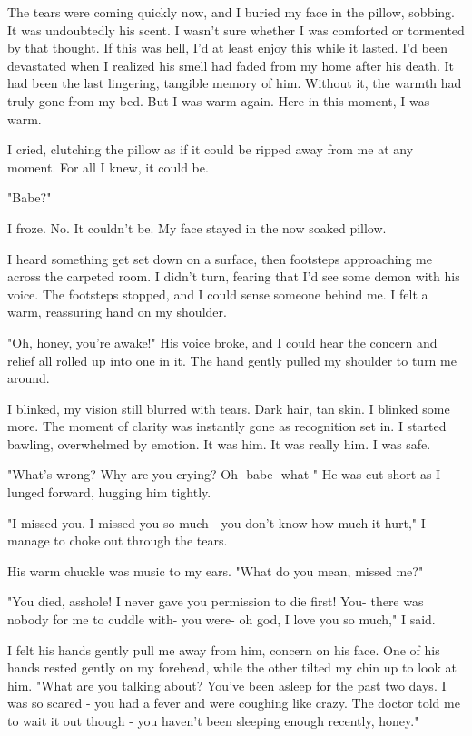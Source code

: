 The tears were coming quickly now, and I buried my face in the pillow, sobbing. It was undoubtedly his scent. I wasn't sure whether I was comforted or tormented by that thought. If this was hell, I'd at least enjoy this while it lasted. I'd been devastated when I realized his smell had faded from my home after his death. It had been the last lingering, tangible memory of him. Without it, the warmth had truly gone from my bed. But I was warm again. Here in this moment, I was warm.

I cried, clutching the pillow as if it could be ripped away from me at any moment. For all I knew, it could be.

"Babe?"

I froze. No. It couldn't be. My face stayed in the now soaked pillow.

I heard something get set down on a surface, then footsteps approaching me across the carpeted room. I didn't turn, fearing that I'd see some demon with his voice. The footsteps stopped, and I could sense someone behind me. I felt a warm, reassuring hand on my shoulder.

"Oh, honey, you're awake!" His voice broke, and I could hear the concern and relief all rolled up into one in it. The hand gently pulled my shoulder to turn me around.

I blinked, my vision still blurred with tears. Dark hair, tan skin. I blinked some more. The moment of clarity was instantly gone as recognition set in. I started bawling, overwhelmed by emotion. It was him. It was really him. I was safe.

"What's wrong? Why are you crying? Oh- babe- what-" He was cut short as I lunged forward, hugging him tightly.

"I missed you. I missed you so much - you don't know how much it hurt," I manage to choke out through the tears.

His warm chuckle was music to my ears. "What do you mean, missed me?"

"You died, asshole! I never gave you permission to die first! You- there was nobody for me to cuddle with- you were- oh god, I love you so much," I said.

I felt his hands gently pull me away from him, concern on his face. One of his hands rested gently on my forehead, while the other tilted my chin up to look at him. "What are you talking about? You've been asleep for the past two days. I was so scared - you had a fever and were coughing like crazy. The doctor told me to wait it out though - you haven't been sleeping enough recently, honey."

